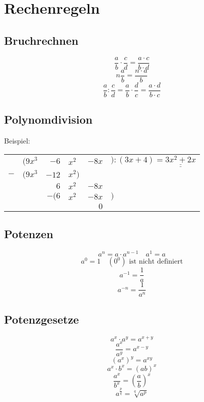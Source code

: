 \section{Rechenregeln}
\subsection{Bruchrechnen}
\[ \boxed{\frac{a}{b} \cdot \frac{c}{d} = \frac{a \cdot c}{b \cdot d}} \]
\[ \boxed{n \frac{a}{b} = \frac{n \cdot a}{b}} \]
\[ \boxed{\frac{a}{b} : \frac{c}{d} = \frac{a}{b} \cdot \frac{d}{c} = \frac{a \cdot d}{b \cdot c}} \]

\subsection{Polynomdivision}
Beispiel: 

\begin{tabular}{|r@{}r@{}r@{}l@{}r@{}l|}
\hline
\rule{0pt}{12pt}&$(9x^3 $&$- 6$&$x^2 $&$- 8x$&$):(3x + 4) = \underline{\underline{3x^2 + 2x}}$\\
$-$&$(9x^3 $&$- 12$&$x^2)$&&\\
&&$6$&$x^2 $&$- 8x$&\\
&&$-(6$&$x^2 $&$- 8x$&$)$\\
&&&&$0$&\\
\hline
\end{tabular}


\subsection{Potenzen}
\[ \boxed{a^n = a \cdot a^{n-1} \quad a^1 = a} \]
\[ \boxed{a^0 = 1 \quad \left(0^0\right)\text{ ist nicht definiert}} \]
\[ \boxed{a^{-1} = \frac{1}{a}} \]
\[ \boxed{a^{-n} = \frac{1}{a^n}} \]

\subsection{Potenzgesetze}
\[ \boxed{a^x \cdot a^y = a^{x+y}} \]
\[ \boxed{\frac{a^x}{a^y} = a^{x-y}} \]
\[ \boxed{(a^x)^y = a^{xy}} \]
\[ \boxed{a^x \cdot b^x = \left(ab\right)^x} \]
\[ \boxed{\frac{a^x}{b^x} = \left(\frac{a}{b}\right)^x} \]
\[ \boxed{a^{\frac{p}{q}} = \sqrt[q]{a^p}} \]

